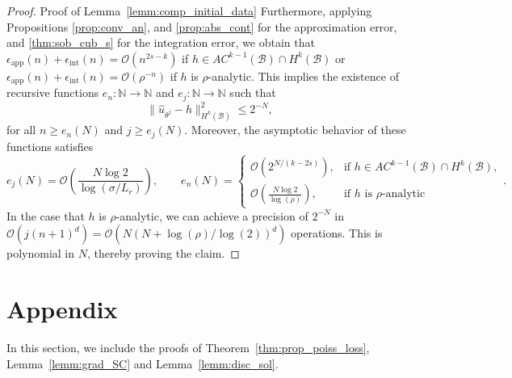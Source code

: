 \documentclass[pdflatex]{sn-jnl}%
\begin{document}
\begin{proof}{Proof of Lemma~\ref{lemm:comp_initial_data}}
Furthermore, applying Propositions \ref{prop:conv_an}, and \ref{prop:abs_cont} for the approximation error, and \ref{thm:sob_cub_s} for the integration error, we obtain that $\epsilon_{\mathrm{app}}(n)+ \epsilon_{\mathrm{int}}(n) = \mathcal{O}(n^{2s-k})$ if $h\in AC^{k-1}(\mathcal{B})\cap H^k(\mathcal{B})$ or $\epsilon_{\mathrm{app}}(n)+ \epsilon_{\mathrm{int}}(n) = \mathcal{O}(\rho^{-n})$ if $h$ is $\rho$-analytic. This implies the existence of recursive functions 
\(e_n:\mathbb{N}\to\mathbb{N}\) and \(e_j:\mathbb{N}\to\mathbb{N}\) such that  
\begin{equation}
    \|\hat{u}_{\theta^j}-h\|_{H^k(\mathcal{B})}^2 \leq 2^{-N},
\end{equation}
for all \(n \geq e_n(N)\) and \(j \geq e_j(N)\). Moreover, the asymptotic 
behavior of these functions satisfies
\[
    e_j(N) = \mathcal{O}\!\left(\frac{N\log 2}{\log(\sigma/L_r)}\right), \qquad
    e_n(N) =
    \begin{cases}
        \mathcal{O}\!\left(2^{N/(k-2s)}\right), & \text{if } h \in AC^{k-1}(\mathcal{B}) \cap H^k(\mathcal{B}), \\[6pt]
        \mathcal{O}\!\left(\tfrac{N\log 2}{\log(\rho)}\right), & \text{if } h \text{ is }\rho\text{-analytic}
    \end{cases}.
\]
In the case that $h$ is $\rho$-analytic, we can achieve a precision of $2^{-N}$ in  $\mathcal{O}(j(n+1)^d)=\mathcal{O}\left(N(N+\log(\rho)/\log(2))^d\right)$ operations. This is polynomial in $N$, thereby proving the claim.  
\end{proof}
\section{Appendix}\label{Appendix_C}
In this section, we include the proofs of Theorem~\ref{thm:prop_poiss_loss}, Lemma~\ref{lemm:grad_SC} and Lemma~\ref{lemm:disc_sol}. 
\end{document}
